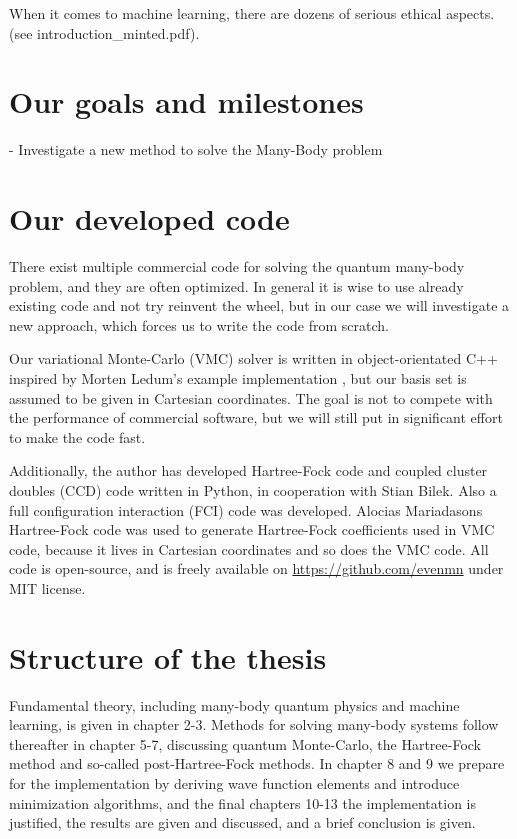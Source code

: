 When it comes to machine learning, there are dozens of serious ethical aspects. (see introduction\_minted.pdf).

\section{Our goals and milestones} \label{subsec:goals}
- Investigate a new method to solve the Many-Body problem

\section{Our developed code}
There exist multiple commercial code for solving the quantum many-body problem, and they are often optimized. In general it is wise to use already existing code and not try reinvent the wheel, but in our case we will investigate a new approach, which forces us to write the code from scratch.

Our variational Monte-Carlo (VMC) solver is written in object-orientated C++ inspired by Morten Ledum's example implementation \cite{ledum_simple_2016}, but our basis set is assumed to be given in Cartesian coordinates. The goal is not to compete with the performance of commercial software, but we will still put in significant effort to make the code fast.  

Additionally, the author has developed Hartree-Fock code and coupled cluster doubles (CCD) code written in Python, in cooperation with Stian Bilek. Also a full configuration interaction (FCI) code was developed. Alocias Mariadasons Hartree-Fock code was used to generate Hartree-Fock coefficients used in VMC code, because it lives in Cartesian coordinates and so does the VMC code. All code is open-source, and is freely available on \url{https://github.com/evenmn} under MIT license. 

\section{Structure of the thesis}
Fundamental theory, including many-body quantum physics and machine learning, is given in chapter 2-3. Methods for solving many-body systems follow thereafter in chapter 5-7, discussing quantum Monte-Carlo, the Hartree-Fock method and so-called post-Hartree-Fock methods. In chapter 8 and 9 we prepare for the implementation by deriving wave function elements and introduce minimization algorithms, and the final chapters 10-13 the implementation is justified, the results are given and discussed, and a brief conclusion is given.
